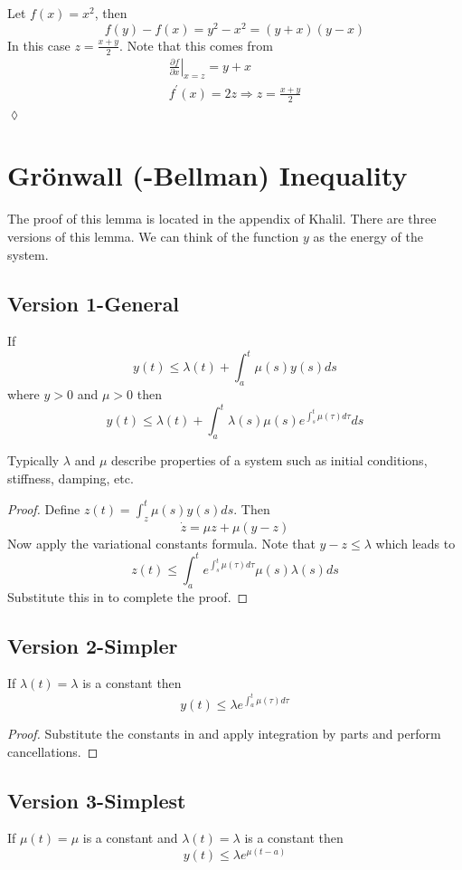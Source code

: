 \begin{example}
Let $f (x) = x^2$, then
$$f (y)-f (x) = y^2-x^2 = (y+x) (y-x)$$
In this case $z=\frac{x+y}{2}$. Note that this comes from
\begin{align*}
\left.\frac{\partial f}{\partial x}\right|_{x=z} = y+x \\
f^\prime(x) = 2z \Rightarrow z = \frac{x+y}{2}
\end{align*}
$\lozenge$
\end{example}

\section{Gr\"onwall (-Bellman) Inequality}
\label{sec:04gronwall}
The proof of this lemma is located in the appendix of Khalil. There are three versions of this lemma. We can think of the function $y$ as the energy of the system.

\subsection{Version 1-General}
\begin{lemma}
If
$$y(t) \leq \lambda(t) + \int_a^t\mu(s)y(s)ds$$
where $y>0$ and $\mu>0$ then
$$y(t) \leq \lambda(t) + \int_a^t \lambda(s)\mu(s) e^{\int_s^t\mu(\tau)d\tau}ds$$
\end{lemma}
Typically $\lambda$ and $\mu$ describe properties of a system such as initial conditions, stiffness, damping, etc.

\begin{proof}
Define $z(t) = \int_z^t \mu(s)y(s)ds$. Then
$$\dot{z} = \mu z + \mu(y-z)$$
Now apply the variational constants formula. Note that $y-z\leq\lambda$ which leads to
$$z(t) \leq \int_a^t e^{\int_s^t \mu(\tau)d\tau}\mu(s)\lambda(s)ds$$
Substitute this in to complete the proof.
\end{proof}

\subsection{Version 2-Simpler}
\begin{lemma}
If $\lambda(t) = \lambda$ is a constant then
$$y(t) \leq \lambda e^{\int_a^t \mu(\tau)d\tau}$$
\end{lemma}

\begin{proof}
Substitute the constants in and apply integration by parts and perform cancellations.
\end{proof}

\subsection{Version 3-Simplest}
\begin{lemma}
If $\mu(t) = \mu$ is a constant and $\lambda(t) = \lambda$ is a constant then
$$y(t) \leq \lambda e^{\mu(t-a)}$$
\end{lemma}
